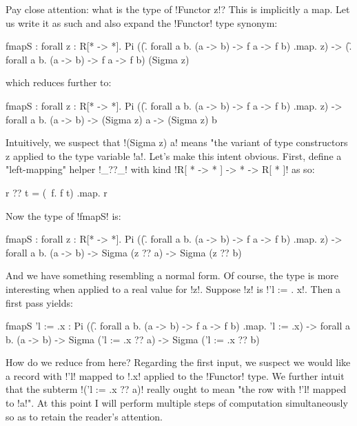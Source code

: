 \documentclass[authoryear, acmsmall, screen, review, nonacm]{acmart} %
\begin{document}
\Ni Pay close attention: what is the type of !Functor z!? This is implicitly a map. Let us write it as such and also expand the !Functor! type synonym:

\begin{rosi}
fmapS : forall z : R[* -> *]. 
      Pi ((\f. forall a b. (a -> b) -> f a -> f b) .map. z) -> 
      (\f. forall a b. (a -> b) -> f a -> f b) (Sigma z)
\end{rosi}

\Ni which reduces further to:

\begin{rosi}
fmapS : forall z : R[* -> *]. 
        Pi ((\f. forall a b. (a -> b) -> f a -> f b) .map. z) -> 
        forall a b. (a -> b) -> (Sigma z) a -> (Sigma z) b
\end{rosi}

\Ni Intuitively, we suspect that !(Sigma z) a! means "the variant of type constructors z applied to the type variable !a!. Let's make this intent obvious. First, define a "left-mapping" helper !_??_!  with kind !R[ * -> * ] -> * -> R[ * ]!  as so:

\begin{rosi}
  r ?? t = (\ f. f t) .map. r
\end{rosi}

\Ni Now the type of !fmapS! is:

\begin{rosi}
fmapS : forall z : R[* -> *]. 
        Pi ((\f. forall a b. (a -> b) -> f a -> f b) .map. z) -> 
        forall a b. (a -> b) -> Sigma (z ?? a) -> Sigma (z ?? b)
\end{rosi}

\Ni And we have something resembling a normal form. Of course, the type is more interesting when applied to a real value for !z!. Suppose !z! is !{'l := \x. x}!. Then a first pass yields:

\begin{rosi}
fmapS {'l := \x.x} : 
        Pi ((\f. forall a b. (a -> b) -> f a -> f b) .map. {'l := \x.x}) -> 
        forall a b. (a -> b) -> Sigma ({'l := \x.x} ?? a) -> Sigma ({'l := \x.x} ?? b)
\end{rosi}

How do we reduce from here? Regarding the first input, we suspect we would like a record with !'l! mapped to !\x.x! applied to the !Functor! type. We further intuit that the subterm !({'l := \x.x} ?? a)! really ought to mean "the row with !'l! mapped to !a!". At this point I will perform multiple steps of computation simultaneously so as to retain the reader's attention.
\end{document}
